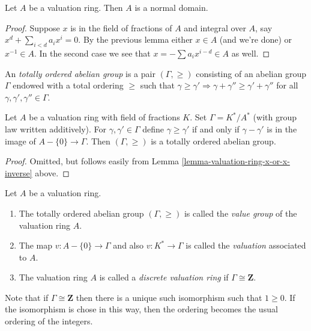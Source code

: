 \begin{lemma}
\label{lemma-valuation-ring-normal}
Let $A$ be a valuation ring.
Then $A$ is a normal domain.
\end{lemma}

\begin{proof}
Suppose $x$ is in the field of fractions of $A$ and integral over $A$,
say $x^d + \sum_{i < d} a_i x^i = 0$. By the previous lemma either
$x \in A$ (and we're done) or $x^{-1} \in A$. In the second case
we see that $x = - \sum a_i x^{i - d} \in A$ as well.
\end{proof}

\noindent
An {\it totally ordered abelian group} is a pair $(\Gamma, \geq)$
consisting of an abelian group $\Gamma$ endowed with a total
ordering $\geq$ such that $\gamma \geq \gamma' \Rightarrow
\gamma + \gamma'' \geq \gamma' + \gamma''$ for all
$\gamma, \gamma', \gamma'' \in \Gamma$.

\begin{lemma}
\label{lemma-valuation-group}
Let $A$ be a valuation ring with field of fractions $K$.
Set $\Gamma = K^*/A^*$ (with group law written additively).
For $\gamma, \gamma' \in \Gamma$
define $\gamma \geq \gamma'$ if and only if
$\gamma - \gamma'$ is in the image of $A - \{0\} \to \Gamma$.
Then $(\Gamma, \geq)$ is a totally ordered abelian group.
\end{lemma}

\begin{proof}
Omitted, but follows easily from
Lemma \ref{lemma-valuation-ring-x-or-x-inverse} above.
\end{proof}

\begin{definition}
\label{definition-value-group}
Let $A$ be a valuation ring.
\begin{enumerate}
\item The totally ordered abelian group $(\Gamma, \geq)$ is called the
{\it value group} of the valuation ring $A$.
\item The map $v : A - \{0\} \to \Gamma$ and also $v : K^* \to \Gamma$ is
called the {\it valuation} associated to $A$.
\item The valuation ring $A$ is called a {\it discrete valuation ring}
if $\Gamma \cong \mathbf{Z}$.
\end{enumerate}
\end{definition}

\noindent
Note that if $\Gamma \cong \mathbf{Z}$ then there is a unique such
isomorphism such that $1 \geq 0$. If the isomorphism is chose in this
way, then the ordering becomes the usual ordering of the integers.

